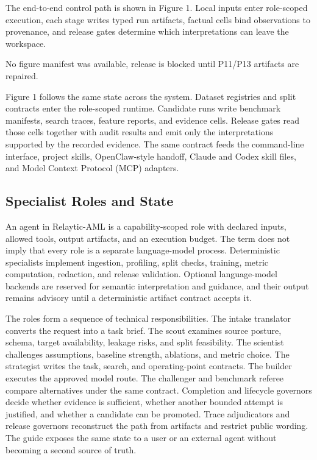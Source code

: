 \documentclass[11pt]{article}
\begin{document}
The end-to-end control path is shown in Figure 1. Local inputs enter role-scoped execution, each stage writes typed run artifacts, factual cells bind observations to provenance, and release gates determine which interpretations can leave the workspace.

No figure manifest was available, release is blocked until P11/P13 artifacts are repaired.

Figure 1 follows the same state across the system. Dataset registries and split contracts enter the role-scoped runtime. Candidate runs write benchmark manifests, search traces, feature reports, and evidence cells. Release gates read those cells together with audit results and emit only the interpretations supported by the recorded evidence. The same contract feeds the command-line interface, project skills, OpenClaw-style handoff, Claude and Codex skill files, and Model Context Protocol (MCP) adapters.

\subsection{Specialist Roles and State}

An agent in Relaytic-AML is a capability-scoped role with declared inputs, allowed tools, output artifacts, and an execution budget. The term does not imply that every role is a separate language-model process. Deterministic specialists implement ingestion, profiling, split checks, training, metric computation, redaction, and release validation. Optional language-model backends are reserved for semantic interpretation and guidance, and their output remains advisory until a deterministic artifact contract accepts it.

The roles form a sequence of technical responsibilities. The intake translator converts the request into a task brief. The scout examines source posture, schema, target availability, leakage risks, and split feasibility. The scientist challenges assumptions, baseline strength, ablations, and metric choice. The strategist writes the task, search, and operating-point contracts. The builder executes the approved model route. The challenger and benchmark referee compare alternatives under the same contract. Completion and lifecycle governors decide whether evidence is sufficient, whether another bounded attempt is justified, and whether a candidate can be promoted. Trace adjudicators and release governors reconstruct the path from artifacts and restrict public wording. The guide exposes the same state to a user or an external agent without becoming a second source of truth.
\end{document}

